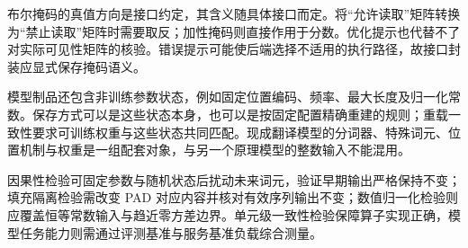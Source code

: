 \documentclass[../textbook.tex]{subfiles}
\begin{document}
布尔掩码的真值方向是接口约定，其含义随具体接口而定。将“允许读取”矩阵转换为“禁止读取”矩阵时需要取反；加性掩码则直接作用于分数。优化提示也代替不了对实际可见性矩阵的核验。错误提示可能使后端选择不适用的执行路径，故接口封装应显式保存掩码语义。

模型制品还包含非训练参数状态，例如固定位置编码、频率、最大长度及归一化常数。保存方式可以是这些状态本身，也可以是按固定配置精确重建的规则；重载一致性要求可训练权重与这些状态共同匹配。现成翻译模型的分词器、特殊词元、位置机制与权重是一组配套对象，与另一个原理模型的整数输入不能混用。

因果性检验可固定参数与随机状态后扰动未来词元，验证早期输出严格保持不变；填充隔离检验需改变 PAD 对应内容并核对有效序列输出不变；数值归一化检验则应覆盖恒等常数输入与趋近零方差边界。单元级一致性检验保障算子实现正确，模型任务能力则需通过评测基准与服务基准负载综合测量。






\chapterreferences
\myendchapterdocument
\end{document}

